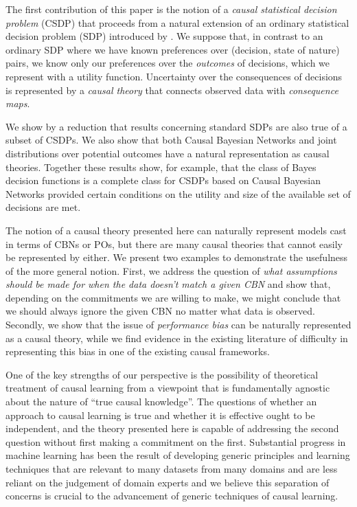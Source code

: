 The first contribution of this paper is the notion of a \emph{causal statistical decision problem} (CSDP) that proceeds from a natural extension of an ordinary statistical decision problem (SDP) introduced by \citep{wald_statistical_1950}. We suppose that, in contrast to an ordinary SDP where we have known preferences over (decision, state of nature) pairs, we know only our preferences over the \emph{outcomes} of decisions, which we represent with a utility function. Uncertainty over the consequences of decisions is represented by a \emph{causal theory} that connects observed data with \emph{consequence maps}. 

We show by a reduction that results concerning standard SDPs are also true of a subset of CSDPs.  We also show that both Causal Bayesian Networks and joint distributions over potential outcomes have a natural representation as causal theories. Together these results show, for example, that the class of Bayes decision functions is a complete class for CSDPs based on Causal Bayesian Networks provided certain conditions on the utility and size of the available set of decisions are met.

The notion of a causal theory presented here can naturally represent models cast in terms of CBNs or POs, but there are many causal theories that cannot easily be represented by either. We present two examples to demonstrate the usefulness of the more general notion. First, we address the question of \emph{what assumptions should be made for when the data doesn't match a given CBN} and show that, depending on the commitments we are willing to make, we might conclude that we should always ignore the given CBN no matter what data is observed. Secondly, we show that the issue of \emph{performance bias} can be naturally represented as a causal theory, while we find evidence in the existing literature of difficulty in representing this bias in one of the existing causal frameworks.

One of the key strengths of our perspective is the possibility of theoretical treatment of causal learning from a viewpoint that is fundamentally agnostic about the nature of ``true causal knowledge''. The questions of whether an approach to causal learning is true and whether it is effective ought to be independent, and the theory presented here is capable of addressing the second question without first making a commitment on the first. Substantial progress in machine learning has been the result of developing generic principles and learning techniques that are relevant to many datasets from many domains and are less reliant on the judgement of domain experts and we believe this separation of concerns is crucial to the advancement of generic techniques of causal learning.

